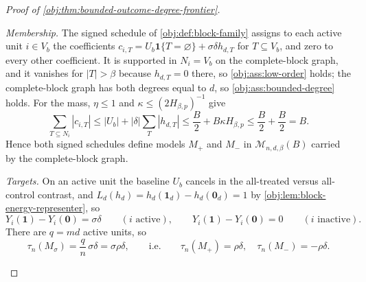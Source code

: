 \begin{proof}[Proof of \cref{obj:thm:bounded-outcome-degree-frontier}]
\begin{enumerate}
\emph{Membership.}  The signed schedule of \cref{obj:def:block-family} assigns to
each active unit \(i\in V_b\) the coefficients
\(c_{i,T}=U_b\mathbf 1\{T=\varnothing\}+\sigma\delta h_{d,T}\) for
\(T\subseteq V_b\), and zero to every other coefficient.  It is supported in
\(N_i=V_b\) on the complete-block graph, and it vanishes for \(|T|>\beta\)
because \(h_{d,T}=0\) there, so \cref{obj:ass:low-order} holds; the complete-block
graph has both degrees equal to \(d\), so \cref{obj:ass:bounded-degree} holds.
For the mass, \(\eta\le1\) and \(\kappa\le(2H_{\beta,p})^{-1}\) give
\[
\sum_{T\subseteq N_i}|c_{i,T}|
\le
|U_b|+|\delta|\sum_T|h_{d,T}|
\le
\frac B2+B\kappa H_{\beta,p}
\le
\frac B2+\frac B2
=B .
\]
Hence both signed schedules define models \(M_+\) and \(M_-\) in
\(\mathcal M_{n,d,\beta}(B)\) carried by the complete-block graph.

\emph{Targets.}  On an active unit the baseline \(U_b\) cancels in the
all-treated versus all-control contrast, and
\(L_d(h_d)=h_d(\mathbf 1_d)-h_d(\mathbf 0_d)=1\) by
\cref{obj:lem:block-energy-representer}, so
\[
Y_i(\mathbf 1)-Y_i(\mathbf 0)=\sigma\delta
\qquad (i\text{ active}),
\qquad
Y_i(\mathbf 1)-Y_i(\mathbf 0)=0
\qquad (i\text{ inactive}).
\]
There are \(q=md\) active units, so
\[
\tau_n(M_\sigma)=\frac{q}{n}\,\sigma\delta=\sigma\rho\delta,
\qquad\text{i.e.}\qquad
\tau_n(M_+)=\rho\delta,
\quad
\tau_n(M_-)=-\rho\delta .
\]


\end{enumerate}
\end{proof}
